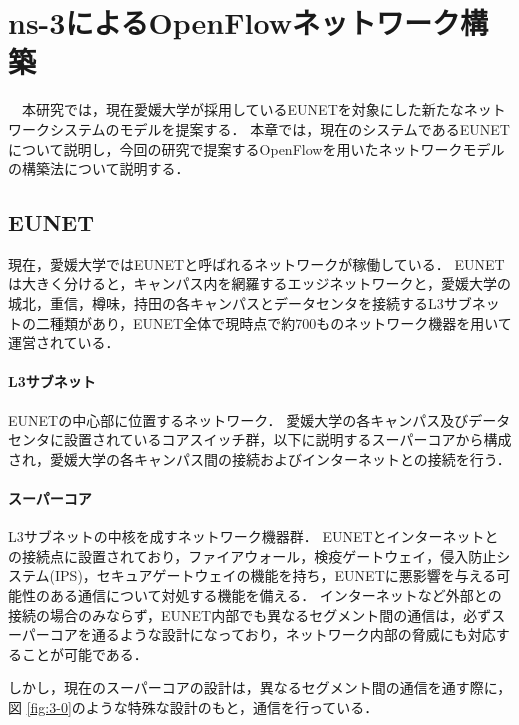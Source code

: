 \chapter{ns-3によるOpenFlowネットワーク構築}

　本研究では，現在愛媛大学が採用しているEUNETを対象にした新たなネットワークシステムのモデルを提案する．
本章では，現在のシステムであるEUNETについて説明し，今回の研究で提案するOpenFlowを用いたネットワークモデルの構築法について説明する．

\section{EUNET}

現在，愛媛大学ではEUNETと呼ばれるネットワークが稼働している．
EUNETは大きく分けると，キャンパス内を網羅するエッジネットワークと，愛媛大学の城北，重信，樽味，持田の各キャンパスとデータセンタを接続するL3サブネットの二種類があり，EUNET全体で現時点で約700ものネットワーク機器を用いて運営されている．

\subsubsection{L3サブネット}

EUNETの中心部に位置するネットワーク．
愛媛大学の各キャンパス及びデータセンタに設置されているコアスイッチ群，以下に説明するスーパーコアから構成され，愛媛大学の各キャンパス間の接続およびインターネットとの接続を行う．

\subsubsection{スーパーコア}

L3サブネットの中核を成すネットワーク機器群．
EUNETとインターネットとの接続点に設置されており，ファイアウォール，検疫ゲートウェイ，侵入防止システム(IPS)，セキュアゲートウェイの機能を持ち，EUNETに悪影響を与える可能性のある通信について対処する機能を備える．
インターネットなど外部との接続の場合のみならず，EUNET内部でも異なるセグメント間の通信は，必ずスーパーコアを通るような設計になっており，ネットワーク内部の脅威にも対応することが可能である．

しかし，現在のスーパーコアの設計は，異なるセグメント間の通信を通す際に，図 \ref{fig:3-0}のような特殊な設計のもと，通信を行っている．

